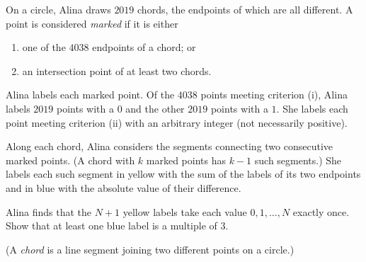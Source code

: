 On a circle, Alina draws $2019$ chords, the endpoints of which are all different. A point is considered \emph{marked} if it is either
\begin{enumerate}[label=(\roman*)]
	\item one of the $4038$ endpoints of a chord; or
	\item an intersection point of at least two chords.
\end{enumerate}
Alina labels each marked point. Of the $4038$ points meeting criterion (i), Alina labels $2019$ points with a $0$ and the other $2019$ points with a $1$. She labels each point meeting criterion (ii) with an arbitrary integer (not necessarily positive).

Along each chord, Alina considers the segments connecting two consecutive marked points. (A chord with $k$ marked points has $k-1$ such segments.) She labels each such segment in yellow with the sum of the labels of its two endpoints and in blue with the absolute value of their difference.

Alina finds that the $N+1$ yellow labels take each value $0,1,\ldots,N$ exactly once. Show that at least one blue label is a multiple of $3$.

(A \emph{chord} is a line segment joining two different points on a circle.)